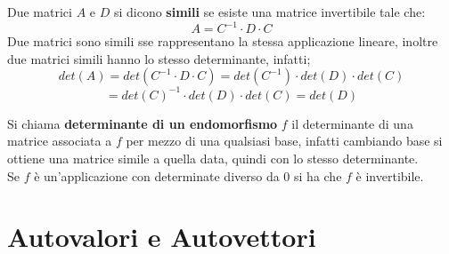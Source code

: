 \documentclass[a4paper,12pt, oneside]{book}
\begin{document}
\begin{definizione}
	Due matrici $A$ e $D$ si dicono \textbf{simili} se esiste una matrice invertibile tale che:
	$$A=C^{-1}\cdot D\cdot C$$
	Due matrici sono simili sse rappresentano la stessa applicazione lineare, inoltre due matrici simili hanno lo stesso determinante, infatti;
	$$det(A)=det(C^{-1}\cdot D\cdot C)=det(C^{-1})\cdot det(D)\cdot det(C)$$
	$$=det(C)^{-1}\cdot det(D)\cdot det(C)=det(D)$$
	\begin{shaded}
		\begin{nota}
			Si chiama \textbf{determinante di un endomorfismo} $f$ il determinante di una matrice associata a $f$ per mezzo di una qualsiasi base, infatti cambiando base si ottiene una matrice simile a quella data, quindi con lo stesso determinante.\\ Se $f$ è un'applicazione con determinate diverso da 0 si ha che $f$ è invertibile.
		\end{nota}
	\end{shaded}
\end{definizione}
\newpage
\section{Autovalori e Autovettori}
\end{document}
